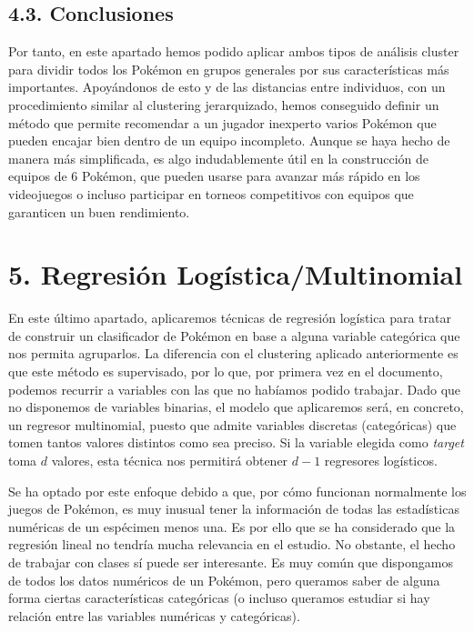 \documentclass[
  12pt,
]{extreport}
\begin{document}
\section{4.3. Conclusiones}\label{conclusiones}

Por tanto, en este apartado hemos podido aplicar ambos tipos de análisis
cluster para dividir todos los Pokémon en grupos generales por sus
características más importantes. Apoyándonos de esto y de las distancias
entre individuos, con un procedimiento similar al clustering
jerarquizado, hemos conseguido definir un método que permite recomendar
a un jugador inexperto varios Pokémon que pueden encajar bien dentro de
un equipo incompleto. Aunque se haya hecho de manera más simplificada,
es algo indudablemente útil en la construcción de equipos de 6 Pokémon,
que pueden usarse para avanzar más rápido en los videojuegos o incluso
participar en torneos competitivos con equipos que garanticen un buen
rendimiento.

\chapter{5. Regresión
Logística/Multinomial}\label{regresiuxf3n-loguxedsticamultinomial}

En este último apartado, aplicaremos técnicas de regresión logística
para tratar de construir un clasificador de Pokémon en base a alguna
variable categórica que nos permita agruparlos. La diferencia con el
clustering aplicado anteriormente es que este método es supervisado, por
lo que, por primera vez en el documento, podemos recurrir a variables
con las que no habíamos podido trabajar. Dado que no disponemos de
variables binarias, el modelo que aplicaremos será, en concreto, un
regresor multinomial, puesto que admite variables discretas
(categóricas) que tomen tantos valores distintos como sea preciso. Si la
variable elegida como \emph{target} toma \(d\) valores, esta técnica nos
permitirá obtener \(d-1\) regresores logísticos.

Se ha optado por este enfoque debido a que, por cómo funcionan
normalmente los juegos de Pokémon, es muy inusual tener la información
de todas las estadísticas numéricas de un espécimen menos una. Es por
ello que se ha considerado que la regresión lineal no tendría mucha
relevancia en el estudio. No obstante, el hecho de trabajar con clases
sí puede ser interesante. Es muy común que dispongamos de todos los
datos numéricos de un Pokémon, pero queramos saber de alguna forma
ciertas características categóricas (o incluso queramos estudiar si hay
relación entre las variables numéricas y categóricas).
\end{document}

